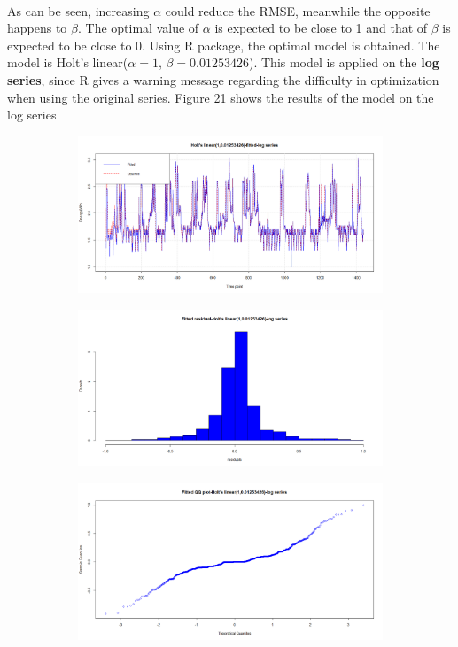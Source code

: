 \documentclass[12pt]{article}
\begin{document}
\paragraph{}
As can be seen, increasing $\alpha$ could reduce the RMSE, meanwhile the opposite happens to $\beta$. The optimal value of $\alpha$ is expected to be close to 1 and that of $\beta$ is expected to be close to 0. Using R package, the optimal model is obtained. The model is Holt's linear($\alpha=1$, $\beta=0.01253426$). This model is applied on the \textbf{log series}, since R gives a warning message regarding the difficulty in optimization when using the original series. \href{figure21}{Figure 21} shows the results of the model on the log series
\begin{figure}[H]
  \centering
  \begin{subfigure}[b]{0.49\linewidth}
    \includegraphics[width=\linewidth]{figure21-1.png}
  \end{subfigure}
  \begin{subfigure}[b]{0.49\linewidth}
    \includegraphics[width=\linewidth]{figure21-2.png}
  \end{subfigure}
  \begin{subfigure}[b]{0.49\linewidth}
    \includegraphics[width=\linewidth]{figure21-3.png}

\end{subfigure}
\end{figure}
\end{document}
